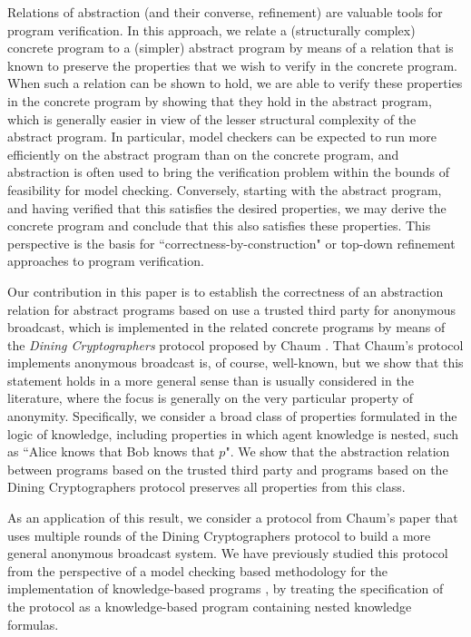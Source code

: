 \documentclass[]{llncs}
\begin{document}
Relations of abstraction (and their converse, refinement) 
are valuable tools for program verification. In this approach, 
we relate a (structurally complex) concrete program to a (simpler) abstract program
by means of a relation that is known to preserve the properties that we wish to verify 
in the concrete program. When such a relation can be shown to hold, 
we are able to verify these properties in the concrete program by 
showing that they hold in the abstract program, which is 
generally easier in view of the lesser structural complexity of the 
abstract program. In particular, model checkers can be expected to 
run more efficiently on the abstract program than on the concrete program, 
and abstraction is often used to bring the verification problem within the 
bounds of feasibility  for model checking. 
Conversely, starting with the abstract program, and 
having verified that this satisfies the desired properties, 
we may derive the concrete program and conclude that this also satisfies 
these properties. This perspective is the basis for ``correctness-by-construction" or top-down refinement 
approaches to program verification.  

Our contribution in this paper is to establish the correctness of an abstraction relation 
for abstract programs based on use a trusted third party for anonymous broadcast, 
which is implemented in the related concrete programs by means of the {\em Dining Cryptographers} protocol 
proposed by Chaum \cite{chaum}. That Chaum's  protocol implements anonymous 
broadcast is, of course, well-known, but we show that this statement holds in a more
general sense than is usually considered in the literature, where the focus is generally on the very particular property of anonymity. 
Specifically, we consider a broad class of properties formulated in the logic of knowledge, including properties in which agent knowledge is nested, 
such as ``Alice knows that Bob knows that $p$". We show that the abstraction relation 
between programs based on the trusted third party and programs based on 
the Dining Cryptographers protocol preserves all properties from this class. 

As an application of this result, we consider a protocol from Chaum's paper \cite{chaum} 
that uses multiple rounds of the Dining Cryptographers protocol to build a more general 
anonymous broadcast system. We have previously studied this protocol from the 
perspective of  a model checking based methodology for the implementation of 
knowledge-based programs \cite{AlBatainehMeyden10}, by treating the specification of the 
protocol as a knowledge-based program containing nested knowledge formulas. 
\end{document}
